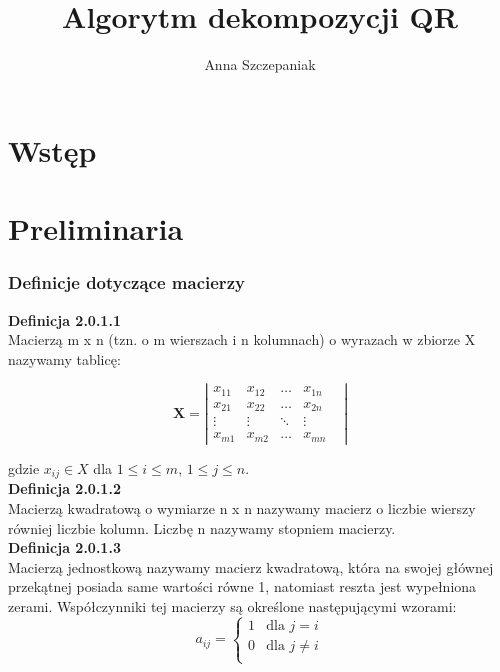 \documentclass[10pt,a4paper]{report}
\author{Anna Szczepaniak}
\title{Algorytm dekompozycji QR}
\begin{document}
\maketitle

\chapter{Wstęp}

\chapter{Preliminaria}

\subsection{Definicje dotyczące macierzy} 

\textbf{Definicja 2.0.1.1}\\
\noindent Macierzą m x n (tzn. o m wierszach i n kolumnach) o wyrazach w zbiorze X nazywamy tablicę:\par
$$
\mathbf{X} =
\left| \begin{matrix}
x_{11} & x_{12} & \ldots & x_{1n}&   \\
x_{21} & x_{22} & \ldots & x_{2n}& \\
\vdots & \vdots & \ddots & \vdots \\
x_{m1} & x_{m2} & \ldots & x_{mn}&
\end{matrix}
\right|
$$\par
\noindent  gdzie $x_{ij} \in X$  dla $1\le i\le m$, $1\le j\le n.$\\

\noindent \textbf{Definicja 2.0.1.2}\\
\noindent Macierzą kwadratową o wymiarze n x n nazywamy macierz o liczbie wierszy równiej liczbie kolumn. Liczbę n nazywamy stopniem macierzy.\\

\noindent \textbf{Definicja 2.0.1.3}\\
\noindent Macierzą jednostkową nazywamy macierz kwadratową, która na swojej głównej przekątnej posiada same wartości równe 1, natomiast reszta jest wypełniona zerami. Współczynniki tej macierzy są określone następującymi wzorami: $$
a_{ij} = \left\{ \begin{array}{ll}
1 & \textrm{dla $j=i$}\\
0 & \textrm{dla $j\ne i$}\\
\end{array} \right.
$$
\end{document}
